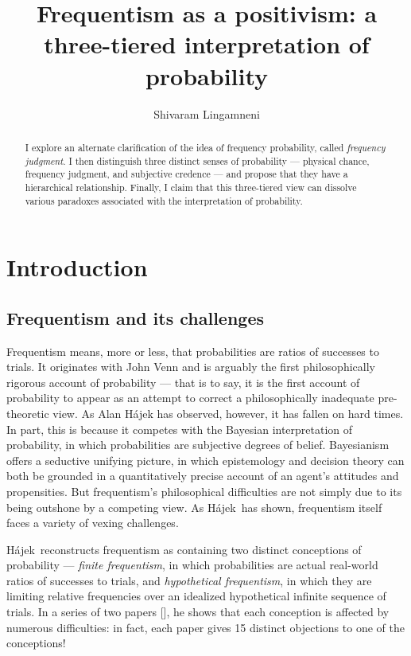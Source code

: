 \documentclass[letterpaper,12pt]{article}
\newcommand{\hajek}{H\'ajek}
\begin{document}


\title{Frequentism as a positivism: a three-tiered interpretation of probability}
\author{Shivaram Lingamneni}
\maketitle

\begin{abstract}
I explore an alternate clarification of the idea of frequency probability, called \emph{frequency judgment}. I then distinguish three distinct senses of probability --- physical chance, frequency judgment, and subjective credence --- and propose that they have a hierarchical relationship. Finally, I claim that this three-tiered view can dissolve various paradoxes associated with the interpretation of probability.
\end{abstract}

\section{Introduction}
\subsection{Frequentism and its challenges}
Frequentism means, more or less, that probabilities are ratios of successes to trials. It originates with John Venn and is arguably the first philosophically rigorous account of probability --- that is to say, it is the first account of probability to appear as an attempt to correct a philosophically inadequate pre-theoretic view. As Alan H\'ajek has observed, however, it has fallen on hard times. In part, this is because it competes with the Bayesian interpretation of probability, in which probabilities are subjective degrees of belief. Bayesianism offers a seductive unifying picture, in which epistemology and decision theory can both be grounded in a quantitatively precise account of an agent's attitudes and propensities. But frequentism's philosophical difficulties are not simply due to its being outshone by a competing view. As \hajek\ has shown, frequentism itself faces a variety of vexing challenges.

\hajek\ reconstructs frequentism as containing two distinct conceptions of probability --- \emph{finite frequentism}, in which probabilities are actual real-world ratios of successes to trials, and \emph{hypothetical frequentism}, in which they are limiting relative frequencies over an idealized hypothetical infinite sequence of trials. In a series of two papers [\citeyear{Hajek1996-HJEMR, Hajek2009-HJEFAA}], he shows that each conception is affected by numerous difficulties: in fact, each paper gives 15 distinct objections to one of the conceptions!
\end{document}

